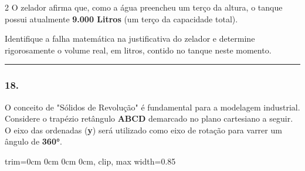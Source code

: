 \documentclass[twoside, 10pt, a4paper]{article}
\newlength{\espacoPreQuestao}\setlength{\espacoPreQuestao}{0.1cm}
\newlength{\espacoQuestao}\setlength{\espacoQuestao}{0.2cm}
\newlength{\larguraTikz}
\begin{document}
\begin{multicols*}{2}
O zelador afirma que, como a água preencheu um terço da altura, o tanque possui atualmente \textbf{9.000 Litros} (um terço da capacidade total).

Identifique a falha matemática na justificativa do zelador e determine rigorosamente o volume real, em litros, contido no tanque neste momento.
\par\vspace{\espacoQuestao}

\noindent\textcolor{CorLinha}{\rule{\linewidth}{0.5pt}} 
\par\vspace{\espacoPreQuestao}
\subsubsection*{18.} O conceito de "Sólidos de Revolução" é fundamental para a modelagem industrial. Considere o trapézio retângulo \textbf{ABCD} demarcado no plano cartesiano a seguir. O eixo das ordenadas (\textbf{y}) será utilizado como eixo de rotação para varrer um ângulo de \textbf{360°}.

\begin{center}
\begin{adjustbox}{trim=0cm 0cm 0cm 0cm, clip, max width=0.85\larguraTikz}
\end{adjustbox}
\end{center}


\end{multicols*}
\end{document}
